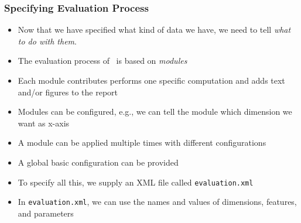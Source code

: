 %
%
\begin{frame}%
\frametitle{Specifying Evaluation Process}%
\begin{itemize}%
\item Now that we have specified what kind of data we have, we need to tell \emph{what to do with them}.%
\item<2-> The evaluation process of \optimizationBenchmarking\ is based on \emph{modules}%
\item<3-> Each module contributes performs one specific computation and adds text and/or figures to the report%
\item<4-> Modules can be configured, e.g., we can tell the  module which dimension we want as x-axis%
\item<5-> A module can be applied multiple times with different configurations%
\item<6-> A global basic configuration can be provided%
\item<7-> To specify all this, we supply an XML file called \texttt{evaluation.xml}%
\item<8-> In \texttt{evaluation.xml}, we can use the names and values of dimensions, features, and parameters%
\end{itemize}%
\end{frame}%
%
